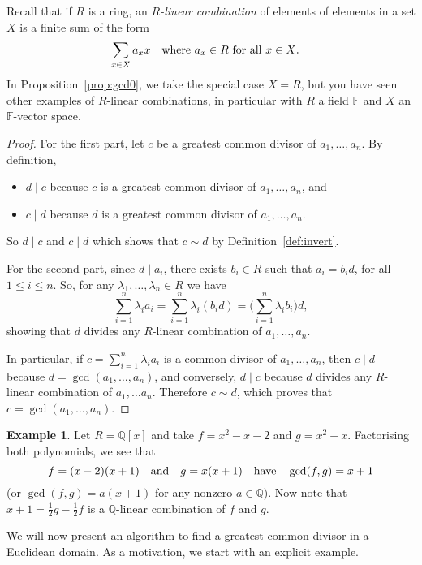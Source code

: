 \documentclass[12pt]{article}
\newcommand{\qbox}[1]{\quad\hbox{#1}\quad}
\def\dst{\displaystyle}
\theoremstyle{definition}
\newtheorem{example}[thm]{Example}
\newcounter{ex}\renewcommand\theex{\arabic{ex}}
\newcommand{\Q}{\ensuremath{\mathbb{Q}}}
\newcommand{\F}{\ensuremath{\mathbb{F}}}
\begin{document}
Recall that if $R$ is a ring, an {\em $R$-linear combination}
 of elements of
elements in a set $X$ is a finite sum of the form
$$\sum_{x\in X}a_xx\qbox{where $a_x\in R$ for all $x\in X$.}$$
In Proposition~\ref{prop:gcd0}, we take the special case $X=R$, but
you have seen other examples of $R$-linear combinations, in particular
with $R$ a field $\F$ and $X$ an $\F$-vector space.

\begin{proof}
For the first part,
let $c$ be a greatest common divisor of $a_1,\dots,a_n$. By
definition,
\begin{itemize}
\item $d\mid c$ because $c$ is a greatest common divisor of
$a_1,\dots,a_n$, and
\item $c\mid d$ because $d$ is a greatest common divisor of
$a_1,\dots,a_n$. 
\end{itemize}
So $d\mid c$ and $c\mid d$ which shows that $c\sim d$ by
Definition~\ref{def:invert}.

For the second part, since $d\mid a_i$, there exists $b_i\in R$ such
that $a_i=b_id$, for all $1\leq i\leq n$.
So, for any $\lambda_1,\dots,\lambda_n\in R$ we have
$$\sum_{i=1}^n\lambda_ia_i=\sum_{i=1}^n\lambda_i(b_id)
=\big(\sum_{i=1}^n\lambda_ib_i\big)d,$$
showing that $d$ divides any $R$-linear combination of
$a_1,\dots,a_n$.

In particular, if $c=\dst\sum_{i=1}^n\lambda_ia_i$ is a common divisor
of $a_1,\dots,a_n$, then $c\mid d$ because $d=\gcd(a_1,\dots,a_n)$,
and conversely, $d\mid c$ because $d$ divides any $R$-linear
combination of $a_1,\dots a_n$. Therefore $c\sim d$, which proves that
$c=\gcd(a_1,\dots,a_n)$. 
\end{proof}

\begin{example}\label{ex:ea-qx0}
Let $R=\Q[x]$ and take $f=x^2-x-2$ and $g=x^2+x$.
Factorising both polynomials, we see that
$$f=(x-2)(x+1)\qbox{and}g=x(x+1)\qbox{have}\gcd(f,g)=x+1$$
(or $\gcd(f,g)=a(x+1)$ for any nonzero $a\in\Q$).
Now note that $x+1=\frac12g-\frac12f$ is a $\Q$-linear combination of
$f$ and $g$.
\end{example}




\smallskip

We will now present an algorithm to find a greatest common divisor in
a Euclidean domain. As a motivation, we start with an explicit
example.
\end{document}
